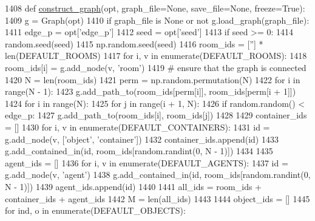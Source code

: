 \begin{DoxyCode}
1408 \textcolor{keyword}{def }\hyperlink{namespaceprojects_1_1mastering__the__dungeon_1_1tasks_1_1graph__world2_1_1graph_a5cd70dc74f0447a0dda626d8c524b4c9}{construct\_graph}(opt, graph\_file=None, save\_file=None, freeze=True):
1409     g = Graph(opt)
1410     \textcolor{keywordflow}{if} graph\_file \textcolor{keywordflow}{is} \textcolor{keywordtype}{None} \textcolor{keywordflow}{or} \textcolor{keywordflow}{not} g.load\_graph(graph\_file):
1411         edge\_p = opt[\textcolor{stringliteral}{'edge\_p'}]
1412         seed = opt[\textcolor{stringliteral}{'seed'}]
1413         \textcolor{keywordflow}{if} seed >= 0:
1414             random.seed(seed)
1415             np.random.seed(seed)
1416         room\_ids = [\textcolor{stringliteral}{''}] * len(DEFAULT\_ROOMS)
1417         \textcolor{keywordflow}{for} i, v \textcolor{keywordflow}{in} enumerate(DEFAULT\_ROOMS):
1418             room\_ids[i] = g.add\_node(v, \textcolor{stringliteral}{'room'})
1419         \textcolor{comment}{# ensure that the graph is connected}
1420         N = len(room\_ids)
1421         perm = np.random.permutation(N)
1422         \textcolor{keywordflow}{for} i \textcolor{keywordflow}{in} range(N - 1):
1423             g.add\_path\_to(room\_ids[perm[i]], room\_ids[perm[i + 1]])
1424         \textcolor{keywordflow}{for} i \textcolor{keywordflow}{in} range(N):
1425             \textcolor{keywordflow}{for} j \textcolor{keywordflow}{in} range(i + 1, N):
1426                 \textcolor{keywordflow}{if} random.random() < edge\_p:
1427                     g.add\_path\_to(room\_ids[i], room\_ids[j])
1428 
1429         container\_ids = []
1430         \textcolor{keywordflow}{for} i, v \textcolor{keywordflow}{in} enumerate(DEFAULT\_CONTAINERS):
1431             id = g.add\_node(v, [\textcolor{stringliteral}{'object'}, \textcolor{stringliteral}{'container'}])
1432             container\_ids.append(id)
1433             g.add\_contained\_in(id, room\_ids[random.randint(0, N - 1)])
1434 
1435         agent\_ids = []
1436         \textcolor{keywordflow}{for} i, v \textcolor{keywordflow}{in} enumerate(DEFAULT\_AGENTS):
1437             id = g.add\_node(v, \textcolor{stringliteral}{'agent'})
1438             g.add\_contained\_in(id, room\_ids[random.randint(0, N - 1)])
1439             agent\_ids.append(id)
1440 
1441         all\_ids = room\_ids + container\_ids + agent\_ids
1442         M = len(all\_ids)
1443 
1444         object\_ids = []
1445         \textcolor{keywordflow}{for} ind, o \textcolor{keywordflow}{in} enumerate(DEFAULT\_OBJECTS):

\end{DoxyCode}
